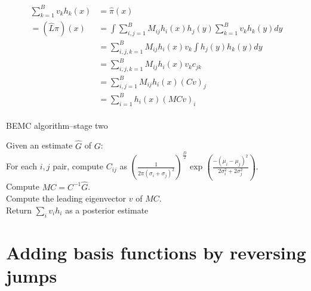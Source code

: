 \documentclass{article}
\newcommand\EMK[1]{\textcolor{purple}{EMK: #1}}
\begin{document}
\begin{align*}
 \sum_{k=1}^Bv_kh_k(x)&=\hat{\pi}(x) \\
= (\hat{L}\hat{\pi})(x) &= \int \sum_{i,j=1}^B M_{ij} h_i(x)h_j(y) \sum_{k=1}^Bv_kh_k(y)dy\\
&=  \sum_{i,j,k=1}^B M_{ij} h_i(x)v_k\int h_j(y)h_k(y)dy\\
&=  \sum_{i,j,k=1}^B M_{ij} h_i(x)v_kc_{jk}\\
&=  \sum_{i,j=1}^B M_{ij} h_i(x)(Cv)_j\\
&=  \sum_{i=1}^B h_i(x)(MCv)_i\\
\end{align*}


\begin{algorithm}[h]
\caption{BEMC algorithm--stage two}
Given an estimate $\hat{G}$ of $G$:\\
For each $i,j$ pair, compute $C_{ij}$ as $(\frac{1}{2\pi (\sigma_i+\sigma_j)^2})^{\frac{D}{2}}\exp(\frac{-(\mu_i-\mu_j)^2}{2\sigma_i^2+2\sigma_j^2})$.\\
Compute ${M}C=C^{-1}\hat{G}$.\\
Compute the leading eigenvector $v$ of $MC$. \\
Return $\sum_i v_i h_i$ as a posterior estimate\\
\end{algorithm}


\section{Adding basis functions by reversing jumps}
\label{sec:reverse_jumps}
\end{document}
